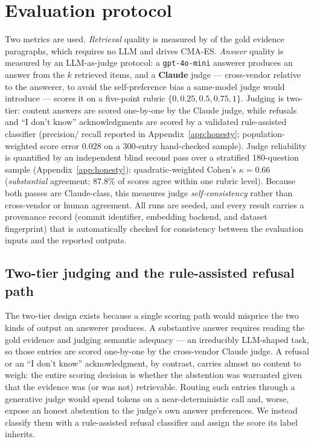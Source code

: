 \section{Evaluation protocol}
\label{sec:eval}
Two metrics are used. \emph{Retrieval} quality is measured by \recallk{} of the
gold evidence paragraphs, which requires no LLM and drives CMA-ES.
\emph{Answer} quality is measured by an LLM-as-judge protocol: a
\texttt{gpt-4o-mini} answerer produces an answer from the $k$ retrieved items,
and a \textbf{Claude} judge --- cross-vendor relative to the answerer, to avoid
the self-preference bias a same-model judge would introduce
\citep{zheng2023judge} --- scores it on a five-point rubric
$\{0,0.25,0.5,0.75,1\}$. Judging is two-tier: content answers are scored
one-by-one by the Claude judge, while refusals and ``I don't know''
acknowledgments are scored by a validated rule-assisted classifier (precision/
recall reported in Appendix~\ref{app:honesty}; population-weighted score error
$0.028$ on a 300-entry hand-checked sample). Judge reliability is quantified by an
independent blind second pass over a stratified 180-question sample
(Appendix~\ref{app:honesty}): quadratic-weighted Cohen's $\kappa = 0.66$
(\emph{substantial} agreement; $87.8\%$ of scores agree within one rubric level).
Because both passes are Claude-class, this measures judge \emph{self-consistency}
rather than cross-vendor or human agreement.
All runs are seeded, and every result carries a provenance record (commit
identifier, embedding backend, and dataset fingerprint) that is automatically
checked for consistency between the evaluation inputs and the reported outputs.

\subsection{Two-tier judging and the rule-assisted refusal path}
\label{sec:tworefusal}
The two-tier design exists because a single scoring path would misprice the two
kinds of output an answerer produces. A substantive answer requires reading the
gold evidence and judging semantic adequacy --- an irreducibly LLM-shaped task,
so those entries are scored one-by-one by the cross-vendor Claude judge. A
refusal or an ``I don't know'' acknowledgment, by contrast, carries almost no
content to weigh: the entire scoring decision is whether the abstention was
warranted given that the evidence was (or was not) retrievable. Routing such
entries through a generative judge would spend tokens on a near-deterministic
call and, worse, expose an honest abstention to the judge's own answer
preferences. We instead classify them with a rule-assisted refusal classifier and
assign the score its label inherits.


